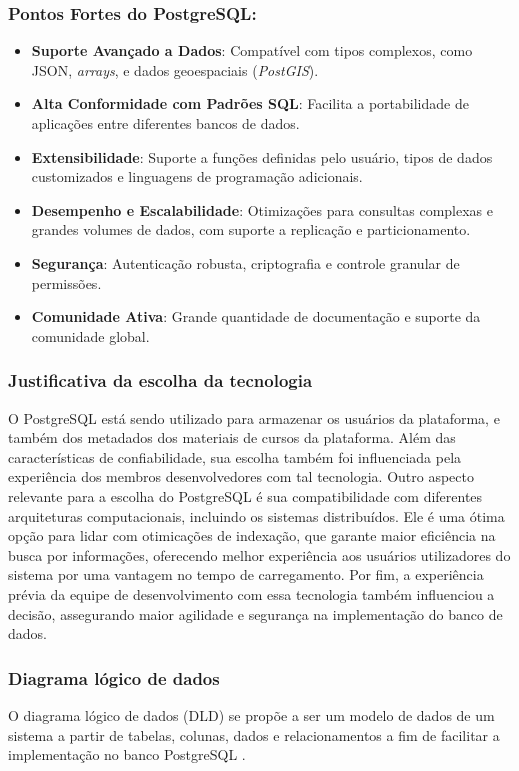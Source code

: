 \subsubsection*{Pontos Fortes do PostgreSQL:}
\begin{itemize}
    \item \textbf{Suporte Avançado a Dados}: Compatível com tipos complexos, como JSON, \textit{arrays}, e dados geoespaciais (\textit{PostGIS}).
    \item \textbf{Alta Conformidade com Padrões SQL}: Facilita a portabilidade de aplicações entre diferentes bancos de dados.
    \item \textbf{Extensibilidade}: Suporte a funções definidas pelo usuário, tipos de dados customizados e linguagens de programação adicionais.
    \item \textbf{Desempenho e Escalabilidade}: Otimizações para consultas complexas e grandes volumes de dados, com suporte a replicação e particionamento.
    \item \textbf{Segurança}: Autenticação robusta, criptografia e controle granular de permissões.
    \item \textbf{Comunidade Ativa}: Grande quantidade de documentação e suporte da comunidade global.
\end{itemize}

\subsubsection{Justificativa da escolha da tecnologia}
O PostgreSQL está sendo utilizado para armazenar os usuários da plataforma, e também dos metadados dos materiais de cursos da plataforma. Além das características de confiabilidade, sua escolha também foi influenciada pela experiência dos membros desenvolvedores com tal tecnologia. Outro aspecto relevante para a escolha do PostgreSQL é sua compatibilidade com diferentes arquiteturas computacionais, incluindo os sistemas distribuídos. Ele é uma ótima opção para lidar com otimicações de indexação, que garante maior eficiência na busca por informações, oferecendo melhor experiência aos usuários utilizadores do sistema por uma vantagem no tempo de carregamento. Por fim, a experiência prévia da equipe de desenvolvimento com essa tecnologia também influenciou a decisão, assegurando maior agilidade e segurança na implementação do banco de dados.

\subsubsection{Diagrama lógico de dados}
O diagrama lógico de dados (DLD) se propõe a ser um modelo de dados de um sistema a partir de tabelas, colunas, dados e relacionamentos a fim de facilitar a implementação no banco PostgreSQL \cite{lucidchart2025}.

